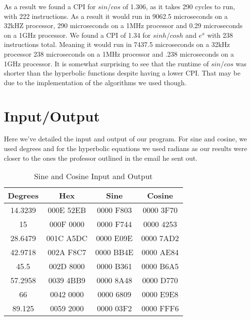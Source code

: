 \documentclass[11pt]{article}
\begin{document}
As a result we found a CPI for $sin$/$cos$ of 1.306, as it takes 290 cycles to run, with 222 instructions. As a
result it would run in 9062.5 microseconds on a 32kHZ processor, 290 microseconds on a 1MHz processor and
0.29 microseconds on a 1GHz processor. We found a CPI of 1.34 for $sinh$/$cosh$ and $e^x$ with 238 instructions total.
Meaning it would run in 7437.5 microseconds on a 32kHz processor 238 microseconds on a 1MHz processor and
.238 microseconds on a 1GHz processor. It is somewhat surprising to see that the runtime of $sin$/$cos$ was
shorter than the hyperbolic functions despite having a lower CPI. That may be due to the implementation of the
algorithms we used though.\\

\section{Input/Output}

Here we've detailed the input and output of our program. For sine and cosine, we used degrees and for the
hyperbolic equations we used radians as our results were closer to the ones the professor outlined in the
email he sent out.\cite{profemailresults}

\begin{table}[h]
 \centering
 \caption{Sine and Cosine Input and Output}
 \begin{tabular}{||c c c c||}
 \hline
 Degrees & Hex & Sine & Cosine \\ [0.5ex]
 \hline\hline
 14.3239    & 000E 52EB & 0000 F803 & 0000 3F70 \\
 \hline
 15         & 000F 0000 & 0000 F744 & 0000 4253 \\
 \hline
 28.6479    & 001C A5DC & 0000 E09E & 0000 7AD2 \\
 \hline
 42.9718    & 002A F8C7 & 0000 BB4E & 0000 AE84 \\
 \hline
 45.5       & 002D 8000 & 0000 B361 & 0000 B6A5 \\
 \hline
 57.2958    & 0039 4BB9 & 0000 8A48 & 0000 D770 \\
 \hline
 66         & 0042 0000 & 0000 6809 & 0000 E9E8 \\
 \hline
 89.125     & 0059 2000 & 0000 03F2 & 0000 FFF6 \\
 \hline
\end{tabular}
\end{table}
\end{document}
